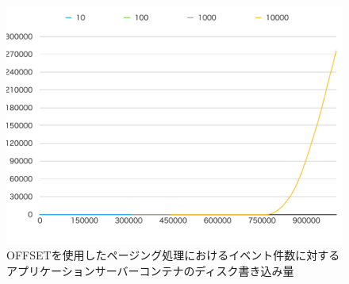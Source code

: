 \documentclass[../../../../../main]{subfiles}
\begin{document}
    \begin{figure}[H]
        \centering
        \includegraphics[width=12cm]{graph}
        \caption{OFFSETを使用したページング処理におけるイベント件数に対するアプリケーションサーバーコンテナのディスク書き込み量}
        \label{fig:paging-offset-app-disk-in-app_1_1024-db_1_1024}
    \end{figure}
\end{document}
